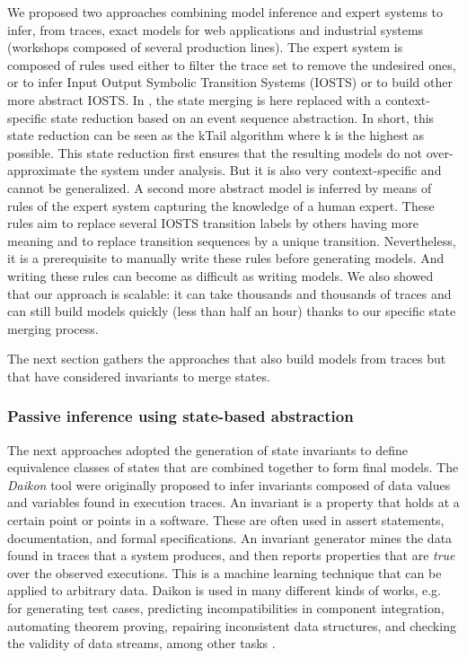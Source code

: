 We proposed two approaches combining model inference and expert systems to infer, from traces, exact models for web applications \cite{DBLP:conf/soict/DurandS14} and industrial systems \cite{DBLP:conf/debs/SalvaD15} (workshops composed of several production lines). The expert system is composed of rules used either to filter the trace set to remove the undesired ones, or to infer Input Output Symbolic Transition Systems (IOSTS) or to build other more abstract IOSTS. In \cite{DBLP:conf/debs/SalvaD15}, the state merging is here replaced with a context-specific state reduction based on an event sequence abstraction. In short, this state reduction can be seen as the kTail algorithm where k is the highest as possible. This state reduction first ensures that the resulting models do not over-approximate the system under analysis. But it is also very context-specific and cannot be generalized. A second more abstract model is inferred by means of rules of the expert system capturing the knowledge of a human expert. These rules aim to replace several IOSTS transition labels by others having more meaning and to replace transition sequences by a unique transition. Nevertheless, it is a prerequisite to manually write these rules before generating models. And writing these rules can become as difficult as writing models.
We also showed that our approach is scalable: it can take thousands and thousands of traces and can still build models quickly (less than half an hour) thanks to our specific state merging process.

The next section gathers the approaches that also build models from traces but that have considered invariants to merge states.


\subsubsection{Passive inference using state-based abstraction}
\label{sec:passive-spec}

The next approaches adopted the generation of state invariants to define equivalence classes of states that are combined together to form final models. The \textit{Daikon} tool \cite{Ernst:1999:DDL:302405.302467} were originally proposed to infer invariants composed of data values and variables found in execution traces. An invariant is a property that holds at a
certain point or points in a software. These are often used in
assert statements, documentation, and formal specifications.
An invariant generator mines the
data found in traces that a system produces, and then reports properties that are \textit{true} over the observed executions.  This is a
machine learning technique that can be applied to arbitrary data.
Daikon is used in many different kinds of works, e.g. for generating test cases,
predicting incompatibilities in component integration, automating
theorem proving, repairing inconsistent data structures, and
checking the validity of data streams, among other tasks
\cite{Ernst200735}.

